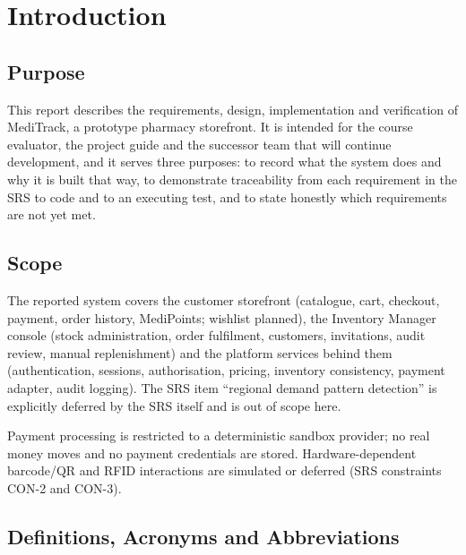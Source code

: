\documentclass[11pt,a4paper]{article}
\begin{document}
\clearpage
{}

\section{Introduction}

\subsection{Purpose}
This report describes the requirements, design, implementation and verification of
MediTrack, a prototype pharmacy storefront. It is intended for the course evaluator,
the project guide and the successor team that will continue development, and it serves
three purposes: to record what the system does and why it is built that way, to
demonstrate traceability from each requirement in the SRS to code and to an executing
test, and to state honestly which requirements are not yet met.

\subsection{Scope}
The reported system covers the customer storefront (catalogue, cart, checkout, payment,
order history, MediPoints; wishlist planned), the Inventory Manager console (stock
administration, order fulfilment, customers, invitations, audit review, manual
replenishment) and the platform services behind them (authentication, sessions,
authorisation, pricing, inventory consistency, payment adapter, audit logging). The SRS
item ``regional demand pattern detection'' is explicitly deferred by the SRS itself and
is out of scope here.

Payment processing is restricted to a deterministic sandbox provider; no real money
moves and no payment credentials are stored. Hardware-dependent barcode/QR and RFID
interactions are simulated or deferred (SRS constraints CON-2 and CON-3).

\subsection{Definitions, Acronyms and Abbreviations}
\end{document}
